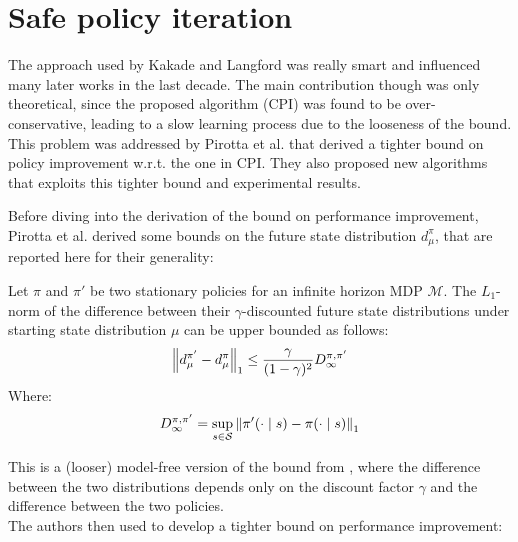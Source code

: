 \section{Safe policy iteration}
\label{sec:spi}
The approach used by Kakade and Langford was really smart and influenced many later works in the last decade. The main contribution though was only theoretical, since the proposed algorithm (CPI) was found to be over-conservative, leading to a slow learning process due to the looseness of the bound. \\
This problem was addressed by Pirotta et al. \cite{safe_iteration} that derived a tighter bound on policy improvement w.r.t. the one in CPI. They also proposed new algorithms that exploits this tighter bound and experimental results.

Before diving into the derivation of the bound on performance improvement, Pirotta et al. derived some bounds on the future state distribution $d_{\mu}^{\pi}$, that are reported here for their generality:

\begin{theorem}
Let $\pi$ and $\pi'$ be two stationary policies for an infinite horizon MDP $\mathcal{M}$. The $L_1$-norm of the difference between their $\gamma$-discounted future state distributions under starting state distribution $\mu$ can be upper bounded as follows:
\begin{equation}
\left\| d_{\mu}^{\pi'} - d_{\mu}^{\pi} \right\|_{1} \leq \frac{\gamma}{(1-\gamma)^2}D_\infty^{\pi, \pi'}
\end{equation}
Where:
\begin{equation}
D_\infty^{\pi, \pi'} = \sup_{s\in\mathcal{S}}\left\| \pi'(\cdot\mid s) - \pi(\cdot \mid s) \right\|_{1}
\end{equation}
\end{theorem}

This is a (looser) model-free version of the bound from \cite{safe_iteration}, where the difference between the two distributions depends only on the discount factor $\gamma$ and the difference between the two policies. \\
The authors then used  to develop a tighter bound on performance improvement:

